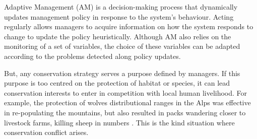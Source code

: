 \documentclass[12pt,a4paper]{article}
\begin{document}
Adaptive Management (AM) is a decision-making process that dynamically updates management policy in response to the system's behaviour.
Acting regularly allows managers to acquire information on how the system responds to change to update the policy heuristically.
Although AM also relies on the monitoring of a set of variables, the choice of these variables can be adapted according to the problems detected along policy updates. 
%
%
%

But, any conservation strategy serves a purpose defined by managers.
If this purpose is too centred on the protection of habitat or species, it can lead conservation interests to enter in competition with local human livelihood.
For example, the protection of wolves distributional ranges in the Alps was effective in re-populating the mountains, but also resulted in packs wandering closer to livestock farms, killing sheep in numbers \citep{behr2017combining}.
This is the kind situation where conservation conflict arises.
\end{document}
